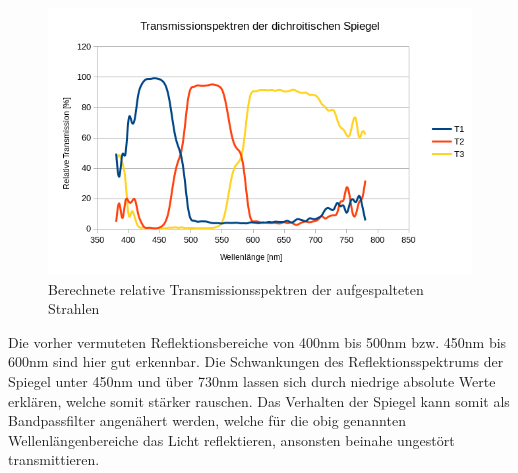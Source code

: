 \begin{figure}[h]
	\centering
	\includegraphics[scale=0.8]{Images/V2_Transmissionen.png}
	\caption{Berechnete relative Transmissionsspektren der aufgespalteten Strahlen}
	\label{V1_REFLECT}
\end{figure}

Die vorher vermuteten Reflektionsbereiche von 400nm bis 500nm bzw. 450nm bis 600nm sind hier gut erkennbar. Die Schwankungen des Reflektionsspektrums der Spiegel unter 450nm und über 730nm lassen sich durch niedrige absolute Werte erklären, welche somit stärker rauschen.
Das Verhalten der Spiegel kann somit als Bandpassfilter angenähert werden, welche für die obig genannten Wellenlängenbereiche das Licht reflektieren, ansonsten beinahe ungestört transmittieren.